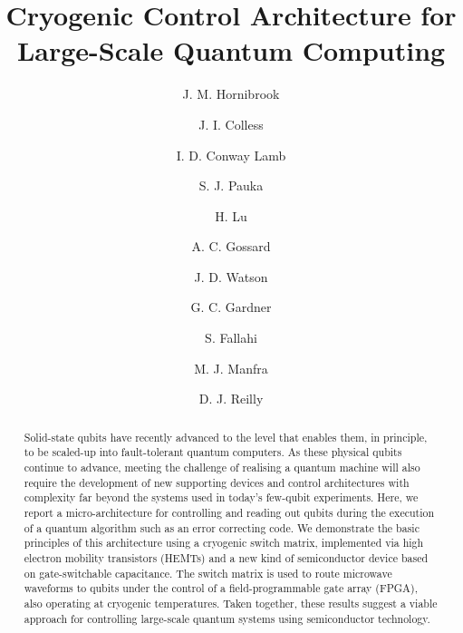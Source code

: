 \makeatletter\frontmatter@init\makeatother

\title{Cryogenic Control Architecture for Large-Scale Quantum Computing}

\author{J. M. Hornibrook}
\author{J. I. Colless}
\author{I. D. Conway Lamb}
\author{S. J. Pauka}
\author{H. Lu}
\author{A. C. Gossard}
\author{J. D. Watson}
\author{G. C. Gardner}
\author{S. Fallahi}
\author{M. J. Manfra}
\author{D. J. Reilly}

\makeatletter
\begingroup
\@author@finish
\frontmatter@author@produce@script
\endgroup
\makeatother

\begin{abstract}
Solid-state qubits have recently advanced to the level that enables them, in principle, to be scaled-up into fault-tolerant quantum computers. As these physical qubits continue to advance, meeting the challenge of realising a quantum machine will also require the development of new supporting devices and control architectures with complexity far beyond the systems used in today's few-qubit experiments. Here, we report a micro-architecture for controlling and reading out qubits during the execution of a quantum algorithm such as an error correcting code. We demonstrate the basic principles of this architecture using a cryogenic switch matrix, implemented via high electron mobility transistors (HEMTs) and a new kind of semiconductor device based on gate-switchable capacitance. The switch matrix is used to route microwave waveforms to qubits under the control of a field-programmable gate array (FPGA), also operating at cryogenic temperatures. Taken together, these results suggest a viable approach for controlling large-scale quantum systems using semiconductor technology.
\end{abstract}

